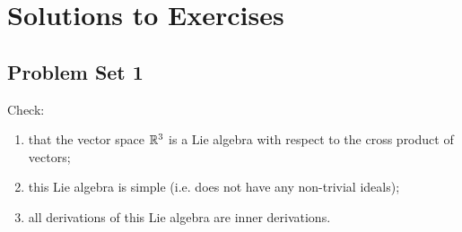 \renewcommand{\leftmark}{Solutions to Exercises}
\section{Solutions to Exercises}

\subsection{Problem Set 1}
\begin{exercise}\label{hw1:ex:one}
Check:
\begin{enumerate}
\item that the vector space $\Bbb{R}^{3}$ is a Lie algebra with
respect to the cross product of vectors;
\item this Lie algebra is simple (i.e. does not have any
  non-trivial ideals);
\item all derivations of this Lie algebra are inner derivations.
\end{enumerate}
\end{exercise}


